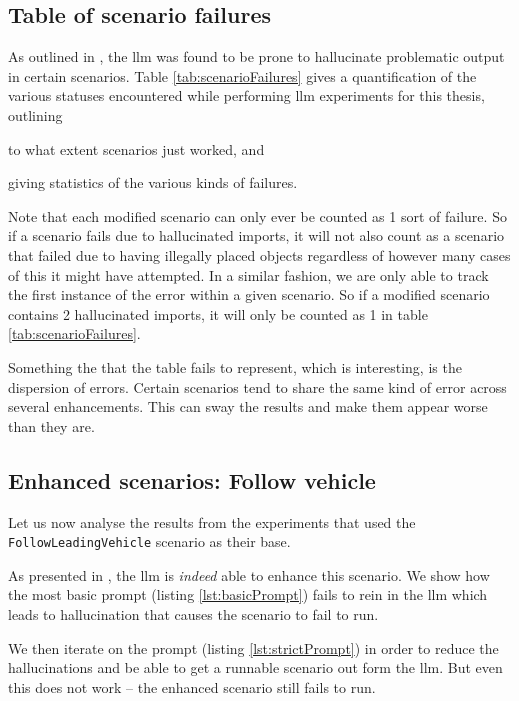 \subsection{Table of scenario failures}

As outlined in , the \acrshort{llm} was found to be prone to
hallucinate problematic output in certain scenarios. Table \ref{tab:scenarioFailures} gives a
quantification of the various statuses encountered while performing
\acrshort{llm} experiments for this thesis, outlining \begin{inparaenum}
    \item to what extent scenarios just worked, and
    \item giving statistics of the various kinds of failures.
\end{inparaenum} Note that each modified scenario can only ever be
counted as \num{1} sort of failure. So if a scenario fails due to hallucinated imports, it
will not also count as a scenario that failed due to having illegally placed objects regardless of
however many cases of this it might have attempted. In a similar fashion, we are only able to track
the first instance of the error within a given scenario. So if a modified scenario contains \num{2}
hallucinated imports, it will only be counted as \num{1} in table \ref{tab:scenarioFailures}.

Something the that the table fails to represent, which is interesting, is the dispersion of errors.
Certain scenarios tend to share the same kind of error across several enhancements. This can sway
the results and make them appear worse than they are.

\subsection{Enhanced scenarios: Follow vehicle}\label{sec:discFollow}

Let us now analyse the results from the experiments that used the\\
\texttt{FollowLeadingVehicle} scenario as their base.

As presented in , the \acrshort{llm} is \emph{indeed} able to enhance
this scenario. We show how the most basic prompt (listing \ref{lst:basicPrompt}) fails to rein in
the \acrshort{llm} which leads to hallucination that causes the scenario to fail to run.

We then iterate on the prompt (listing \ref{lst:strictPrompt}) in order to reduce the hallucinations
and be able to get a runnable scenario out form the \acrshort{llm}. But even this does not work --
the enhanced scenario still fails to run.


